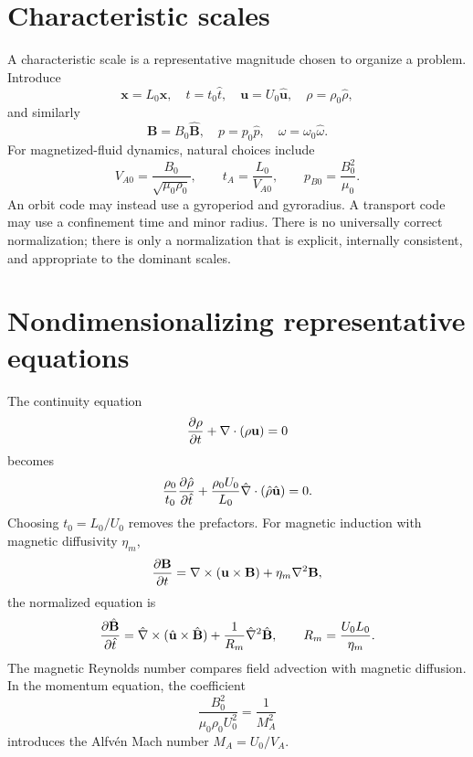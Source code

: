 \documentclass[11pt]{article}
\begin{document}
\section{Characteristic scales}

A characteristic scale is a representative magnitude chosen to organize a problem. Introduce
\begin{equation}
\mathbf x=L_0\hat{\mathbf x},\quad
t=t_0\hat t,\quad
\mathbf u=U_0\hat{\mathbf u},\quad
\rho=\rho_0\hat\rho,
\end{equation}
and similarly
\begin{equation}
\mathbf B=B_0\hat{\mathbf B},\quad
p=p_0\hat p,\quad
\omega=\omega_0\hat\omega.
\end{equation}
For magnetized-fluid dynamics, natural choices include
\begin{equation}
V_{A0}=\frac{B_0}{\sqrt{\mu_0\rho_0}},
\qquad
t_A=\frac{L_0}{V_{A0}},
\qquad
p_{B0}=\frac{B_0^2}{\mu_0}.
\end{equation}
An orbit code may instead use a gyroperiod and gyroradius. A transport code may use a confinement time and minor radius. There is no universally correct normalization; there is only a normalization that is explicit, internally consistent, and appropriate to the dominant scales.


\section{Nondimensionalizing representative equations}

The continuity equation
\begin{equation}
\pdv{\rho}{t}+\nabla\cdot(\rho\mathbf u)=0
\end{equation}
becomes
\begin{equation}
\frac{\rho_0}{t_0}\pdv{\hat\rho}{\hat t}
+\frac{\rho_0U_0}{L_0}\hat\nabla\cdot(\hat\rho\hat{\mathbf u})=0.
\end{equation}
Choosing $t_0=L_0/U_0$ removes the prefactors. For magnetic induction with magnetic diffusivity $\eta_m$,
\begin{equation}
\pdv{\mathbf B}{t}
=\nabla\times(\mathbf u\times\mathbf B)+\eta_m\nabla^2\mathbf B,
\end{equation}
the normalized equation is
\begin{equation}
\pdv{\hat{\mathbf B}}{\hat t}
=\hat\nabla\times(\hat{\mathbf u}\times\hat{\mathbf B})
+\frac{1}{R_m}\hat\nabla^2\hat{\mathbf B},
\qquad
R_m=\frac{U_0L_0}{\eta_m}.
\end{equation}
The magnetic Reynolds number compares field advection with magnetic diffusion. In the momentum equation, the coefficient
\begin{equation}
\frac{B_0^2}{\mu_0\rho_0U_0^2}=\frac{1}{M_A^2}
\end{equation}
introduces the Alfv\'en Mach number $M_A=U_0/V_A$.
\end{document}
